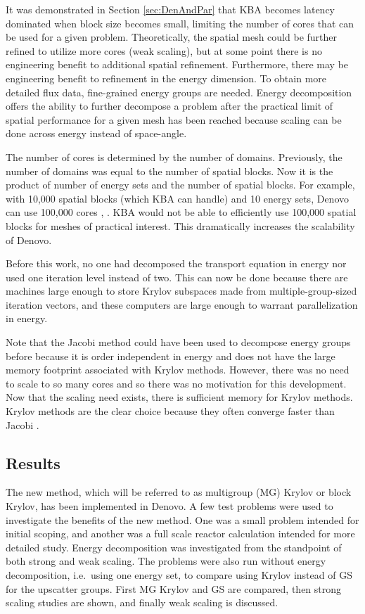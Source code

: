 It was demonstrated in Section \ref{sec:DenAndPar} that KBA becomes latency dominated when block size becomes small, limiting the number of cores that can be used for a given problem. Theoretically, the spatial mesh could be further refined to utilize more cores (weak scaling), but at some point there is no engineering benefit to additional spatial refinement. Furthermore, there may be engineering benefit to refinement in the energy dimension. To obtain more detailed flux data, fine-grained energy groups are needed. Energy decomposition offers the ability to further decompose a problem after the practical limit of spatial performance for a given mesh has been reached because scaling can be done across energy instead of space-angle. 

The number of cores is determined by the number of domains. Previously, the number of domains was equal to the number of spatial blocks. Now it is the product of number of energy sets and the number of spatial blocks. For example, with 10,000 spatial blocks (which KBA can handle) and 10 energy sets, Denovo can use 100,000 cores \cite{Evans2011}, \cite{Evans2010}. KBA would not be able to efficiently use 100,000 spatial blocks for meshes of practical interest. This dramatically increases the scalability of Denovo.

Before this work, no one had decomposed the transport equation in energy nor used one iteration level instead of two. This can now be done because there are machines large enough to store Krylov subspaces made from multiple-group-sized iteration vectors, and these computers are large enough to warrant parallelization in energy. 

Note that the Jacobi method could have been used to decompose energy groups before because it is order independent in energy and does not have the large memory footprint associated with Krylov methods. However, there was no need to scale to so many cores and so there was no motivation for this development. Now that the scaling need exists, there is sufficient memory for Krylov methods. Krylov methods are the clear choice because they often converge faster than Jacobi \cite{LeVeque2007}. 

\subsection{Results}
The new method, which will be referred to as multigroup (MG) Krylov or block Krylov, has been implemented in Denovo. A few test problems were used to investigate the benefits of the new method. One was a small problem intended for initial scoping, and another was a full scale reactor calculation intended for more detailed study. Energy decomposition was investigated from the standpoint of both strong and weak scaling. The problems were also run without energy decomposition, i.e.\ using one energy set, to compare using Krylov instead of GS for the upscatter groups. First MG Krylov and GS are compared, then strong scaling studies are shown, and finally weak scaling is discussed.

